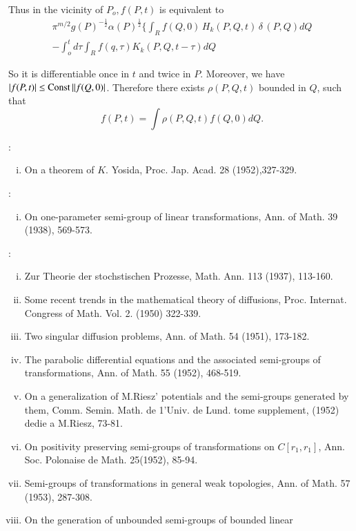 Thus in the vicinity of $P_o, f(P,t)$ is equivalent to 
\begin{multline*}
 \pi^{m/2} g(P)^{- \frac{1}{2}} \alpha (P)^{\frac{1}{2}} \bigg \{
 \int_R f(Q,0)\, H_k(P,Q,t)\, \delta \,(P, Q) d Q \\ 
 - \int^t_o d \tau \int_R f(q, \tau )K_k(P,Q,t- \tau ) dQ
\end{multline*}

So it is differentiable once in $t$ and twice in $P$. Moreover, we
have $| f(P,t) |\le \operatorname{Const} || f(Q,0) |$. Therefore there exists
$\rho (P,Q,t)$ bounded in $Q$, such that 
$$
f(P,t)= \int \rho (P,Q,t) f(Q,0) d Q.
$$

\begin{thebibliography}{99}
:\pageoriginale 
 \begin{enumerate}[(i)]
 \item On a theorem of $K$. Yosida, Proc. Jap. Acad. 28
   (1952),327-329. 
 \end{enumerate}
: 
 \begin{enumerate}[(i)]
 \item On one-parameter semi-group of linear transformations,
  Ann. of Math. 39 (1938), 569-573. 
 \end{enumerate}
: 
 \begin{enumerate}[(i)]
 \item Zur Theorie der stochstischen Prozesse, Math. Ann. 113
  (1937), 113-160. 
 \item Some recent trends in the mathematical theory of diffusions,
  Proc. Internat. Congress of Math. Vol. 2. (1950) 322-339. 
 \item Two singular diffusion problems, Ann. of Math. 54 (1951), 173-182.
 \item The parabolic differential equations and the associated
  semi-groups of transformations, Ann. of Math. 55 (1952),
  468-519. 
 \item On a generalization of M.Riesz' potentials and the semi-groups
  generated by them, Comm. Semin. Math. de 1'Univ. de Lund. tome
  supplement, (1952) dedie a M.Riesz, 73-81. 
 \item On positivity preserving semi-groups of transformations on $C
  [r_1, r_1]$, Ann. Soc. Polonaise de Math. 25(1952), 85-94. 
 \item Semi-groups of transformations in general weak topologies,
  Ann. of Math. 57 (1953), 287-308. 
 \item On the generation of unbounded semi-groups of bounded linear

\end{enumerate}
\end{thebibliography}
